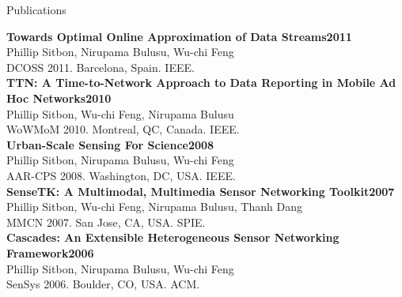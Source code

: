 \documentclass[12pt]{article}
\newcommand{\pubitem}[4]{
	{\bfseries \footnotesize{#1}}\hfill{\bfseries \scriptsize{#2}}
	\\\hspace*{0.25in}#3\\\hspace*{0.25in}#4\\[1.0mm]
}
\begin{document}
\begin{resumeblock}{Publications}

\pubitem
	{Towards Optimal Online Approximation of Data Streams}
	{2011}
	{Phillip Sitbon, Nirupama Bulusu, Wu-chi Feng}
	{DCOSS 2011. Barcelona, Spain. IEEE.}
\pubitem
	{TTN: A Time-to-Network Approach to Data Reporting in Mobile Ad Hoc Networks}
	{2010}
	{Phillip Sitbon, Wu-chi Feng, Nirupama Bulusu}
	{WoWMoM 2010. Montreal, QC, Canada. IEEE.}
\pubitem
	{Urban-Scale Sensing For Science}
	{2008}
	{Phillip Sitbon, Nirupama Bulusu, Wu-chi Feng}
	{AAR-CPS 2008. Washington, DC, USA. IEEE.}
\pubitem
	{SenseTK: A Multimodal, Multimedia Sensor Networking Toolkit}
	{2007}
	{Phillip Sitbon, Wu-chi Feng, Nirupama Bulusu, Thanh Dang}
	{MMCN 2007. San Jose, CA, USA. SPIE.}
\pubitem
	{Cascades: An Extensible Heterogeneous Sensor Networking Framework}
	{2006}
	{Phillip Sitbon, Nirupama Bulusu, Wu-chi Feng}
	{SenSys 2006. Boulder, CO, USA. ACM.}
\end{resumeblock}
\end{document}
